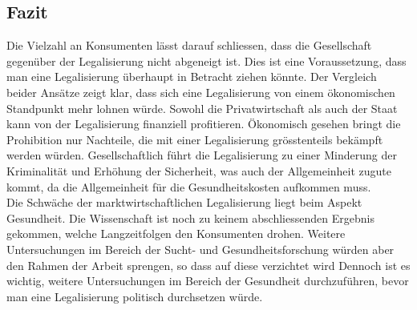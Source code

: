 \documentclass[../main.tex]{subfiles}
\begin{document}
	
	\subsection{Fazit}
	Die Vielzahl an Konsumenten lässt darauf schliessen, dass die Gesellschaft gegenüber der Legalisierung nicht abgeneigt ist.
	Dies ist eine Voraussetzung, dass man eine Legalisierung überhaupt in Betracht ziehen könnte.
	Der Vergleich beider Ansätze zeigt klar, dass sich eine Legalisierung von einem ökonomischen Standpunkt mehr lohnen würde.
	Sowohl die Privatwirtschaft als auch der Staat kann von der Legalisierung finanziell profitieren.
	Ökonomisch gesehen bringt die Prohibition nur Nachteile, die mit einer Legalisierung grösstenteils bekämpft werden würden.
	Gesellschaftlich führt die Legalisierung zu einer Minderung der Kriminalität und Erhöhung der Sicherheit, was auch der Allgemeinheit zugute kommt, da die Allgemeinheit für die Gesundheitskosten aufkommen muss.\\
	
	\noindent		
	Die Schwäche der marktwirtschaftlichen Legalisierung liegt beim Aspekt Gesundheit.
	Die Wissenschaft ist noch zu keinem abschliessenden Ergebnis gekommen, welche Langzeitfolgen den Konsumenten drohen.
	Weitere Untersuchungen im Bereich der Sucht- und Gesundheitsforschung würden aber den Rahmen der Arbeit sprengen, so dass auf diese verzichtet wird
	Dennoch ist es wichtig, weitere Untersuchungen im Bereich der Gesundheit durchzuführen, bevor man eine Legalisierung politisch durchsetzen würde.
	

	
\end{document}
